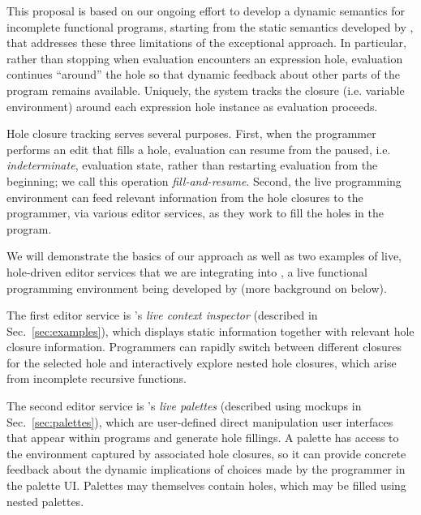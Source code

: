 

This proposal is based on our ongoing effort to develop a dynamic semantics for incomplete functional programs, starting from the static semantics developed by \citet{popl-paper},  that addresses these three limitations of the exceptional approach. 
In particular, rather than stopping when evaluation encounters an expression hole, evaluation continues ``around'' the hole so that dynamic feedback about other parts of the program remains available. 
Uniquely, the system tracks the closure (i.e. variable environment) around each expression hole instance as evaluation proceeds.

Hole closure tracking serves several purposes. 
%
First, when the programmer performs an edit that fills a hole, evaluation can resume from the paused, i.e. \emph{indeterminate}, evaluation state, rather than restarting evaluation from the beginning;
%
we call this operation \emph{fill-and-resume}. 
%
Second, the live programming environment can feed relevant information from the {hole closures} to the programmer, via various editor services, as they work to fill the holes in the program. 


We will demonstrate the basics of our approach as well as two examples of live, hole-driven editor services that we are integrating into \Hazel, a live functional programming environment being developed by \citet{HazelnutSNAPL}
(more background on \Hazel below). 

The first editor service is \Hazel's \emph{live context inspector} (described in Sec.~\ref{sec:examples}),
which displays static information together with relevant hole closure information. 
Programmers can rapidly switch between different closures for the selected hole and interactively explore nested hole closures, which arise from incomplete recursive functions.

The second editor service is \Hazel's \emph{live palettes} (described using mockups in Sec.~\ref{sec:palettes}), which are user-defined direct manipulation user interfaces that appear within \Hazel programs and generate hole fillings. 
A palette has access to the environment captured by associated hole closures, so it can provide concrete feedback about the dynamic implications of choices made by the programmer in the palette UI.
Palettes may themselves contain holes, which may be filled using nested palettes.

